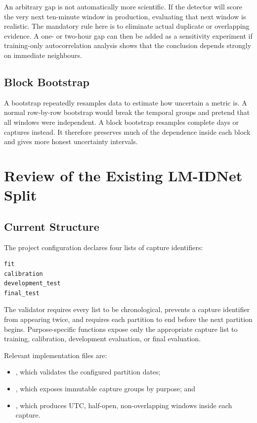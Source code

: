 \documentclass[11pt,a4paper]{article}
\begin{document}
An arbitrary gap is not automatically more scientific. If the detector will
score the very next ten-minute window in production, evaluating that next
window is realistic. The mandatory rule here is to eliminate actual duplicate
or overlapping evidence. A one- or two-hour gap can then be added as a
sensitivity experiment if training-only autocorrelation analysis shows that the
conclusion depends strongly on immediate neighbours.

\subsection{Block Bootstrap}

A bootstrap repeatedly resamples data to estimate how uncertain a metric is.
A normal row-by-row bootstrap would break the temporal groups and pretend that
all windows were independent. A block bootstrap resamples complete days or
captures instead. It therefore preserves much of the dependence inside each
block and gives more honest uncertainty intervals.

\section{Review of the Existing LM-IDNet Split}

\subsection{Current Structure}

The project configuration declares four lists of capture identifiers:

\begin{verbatim}
fit
calibration
development_test
final_test
\end{verbatim}

The validator requires every list to be chronological, prevents a capture
identifier from appearing twice, and requires each partition to end before the
next partition begins. Purpose-specific functions expose only the appropriate
capture list to training, calibration, development evaluation, or final
evaluation.

Relevant implementation files are:

\begin{itemize}

\item
{}, which validates the configured partition dates;

\item
{}, which exposes immutable capture groups by
purpose; and

\item
{}, which produces UTC,
half-open, non-overlapping windows inside each capture.

\end{itemize}
\end{document}
